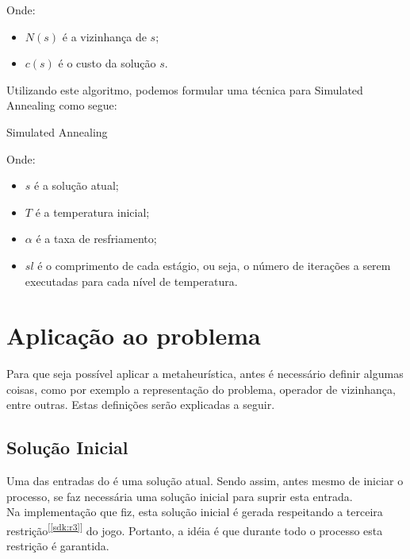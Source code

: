 \documentclass[10pt,a4paper,titlepage]{article}
\begin{document}
Onde:
\begin{itemize}
	\item $N(s)$ é a vizinhança de $s$;
	\item $c(s)$ é o custo da solução $s$.
\end{itemize}

Utilizando este algoritmo, podemos formular uma técnica para Simulated Annealing como segue:
\\
\begin{algorithm}[H]
 \LinesNumbered
 \;
 \caption{Simulated Annealing} \label{alg:sa}
\end{algorithm}

Onde:
\begin{itemize}
	\item $s$ é a solução atual;
	\item $T$ é a temperatura inicial;
	\item $\alpha$ é a taxa de resfriamento;
	\item $sl$ é o comprimento de cada estágio, ou seja, o número de iterações a serem executadas para cada nível de temperatura.
\end{itemize}

\section{Aplicação ao problema}
	Para que seja possível aplicar a metaheurística, antes é necessário definir algumas coisas, como por exemplo a representação do problema, operador de vizinhança, entre outras. Estas definições serão explicadas a seguir.

	\subsection{Solução Inicial} \label{aplic:si}
	Uma das entradas do  é uma solução atual. Sendo assim, antes mesmo de iniciar o processo, se faz necessária uma solução inicial para suprir esta entrada. \\
	Na implementação que fiz, esta solução inicial é gerada respeitando a terceira restrição\textsuperscript{[\ref{sdk:r3}]} do jogo. Portanto, a idéia é que durante todo o processo esta restrição é garantida.
	
\end{document}
